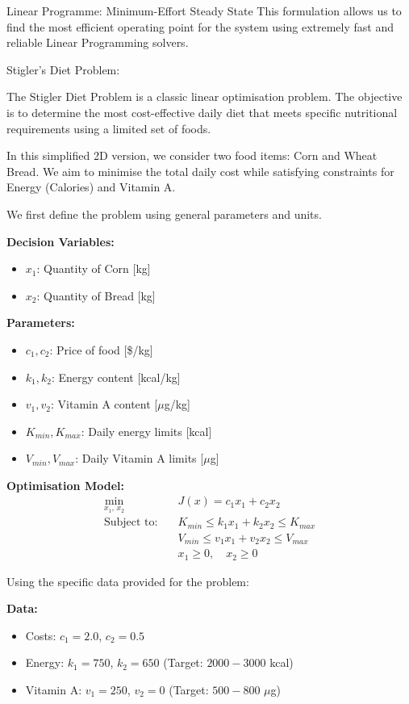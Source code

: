 \begin{examplebox}{Linear Programme: Minimum-Effort Steady State}
	This formulation allows us to find the most efficient operating point for the system using extremely fast and reliable Linear Programming solvers.
\end{examplebox}

\begin{examplebox}{Stigler's Diet Problem:}
	
The Stigler Diet Problem is a classic linear optimisation problem. The objective is to determine the most cost-effective daily diet that meets specific nutritional requirements using a limited set of foods.

In this simplified 2D version, we consider two food items: {Corn} and {Wheat Bread}. We aim to minimise the total daily cost while satisfying constraints for {Energy (Calories)} and {Vitamin A}.

We first define the problem using general parameters and units.

\textbf{Decision Variables:}
\begin{itemize}
	\item $x_1$: Quantity of Corn [kg]
	\item $x_2$: Quantity of Bread [kg]
\end{itemize}

\textbf{Parameters:}
\begin{itemize}
	\item $c_1, c_2$: Price of food [\$/kg]
	\item $k_1, k_2$: Energy content [kcal/kg]
	\item $v_1, v_2$: Vitamin A content [$\mu$g/kg]
	\item $K_{min}, K_{max}$: Daily energy limits [kcal]
	\item $V_{min}, V_{max}$: Daily Vitamin A limits [$\mu$g]
\end{itemize}

\textbf{Optimisation Model:}
\begin{align*}
	\underset{x_1,\,x_2}{\text{min}} \quad & J(x) = c_1 x_1 + c_2 x_2 \\
	\text {Subject to:} \quad & K_{min} \leq k_1 x_1 + k_2 x_2 \leq K_{max} \\
	& V_{min} \leq v_1 x_1 + v_2 x_2 \leq V_{max} \\
	& x_1 \geq 0, \quad x_2 \geq 0
\end{align*}

Using the specific data provided for the problem:

\textbf{Data:}
\begin{itemize}
	\item Costs: $c_1 = 2.0$, $c_2 = 0.5$
	\item Energy: $k_1 = 750$, $k_2 = 650$ (Target: $2000 - 3000$ kcal)
	\item Vitamin A: $v_1 = 250$, $v_2 = 0$ (Target: $500 - 800$ $\mu$g)
\end{itemize}


\end{examplebox}

